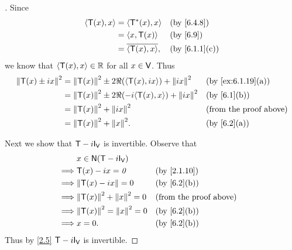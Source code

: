\begin{proof}[]
	Since
	\begin{align*}
		\inn{\T(x), x} & = \inn{\T^*(x), x}       &  & \by{6.4.8}    \\
		               & = \inn{x, \T(x)}         &  & \by{6.9}      \\
		               & = \conj{\inn{\T(x), x}}, &  & \by{6.1.1}[c]
	\end{align*}
	we know that \(\left\langle\mathsf{T}(x), x\right\rangle \in \mathbb{R}\) for all \(x \in \mathsf{V}\).
	Thus
	\begin{align*}
		\norm{\T(x) \pm ix}^2 & = \norm{\T(x)}^2 \pm 2 \Re(\inn{\T(x), ix}) + \norm{ix}^2   &  & \by{ex:6.1.19}[a]             \\
		                      & = \norm{\T(x)}^2 \pm 2 \Re(-i \inn{\T(x), x}) + \norm{ix}^2 &  & \by{6.1}[b]                   \\
		                      & = \norm{\T(x)}^2 + \norm{ix}^2                              &  & \text{(from the proof above)} \\
		                      & = \norm{\T(x)}^2 + \norm{x}^2.                              &  & \by{6.2}[a]
	\end{align*}

	Next we show that \(\T - i \IT[\V]\) is invertible.
	Observe that
	\begin{align*}
		         & x \in \ns{\T - i \IT[\V]}                                          \\
		\implies & \T(x) - ix = \zv                &  & \by{2.1.10}                   \\
		\implies & \norm{\T(x) - ix} = 0           &  & \by{6.2}[b]                   \\
		\implies & \norm{\T(x)}^2 + \norm{x}^2 = 0 &  & \text{(from the proof above)} \\
		\implies & \norm{\T(x)}^2 = \norm{x}^2 = 0 &  & \by{6.2}[b]                   \\
		\implies & x = 0.                          &  & \by{6.2}[b]
	\end{align*}
	Thus by \cref{2.5} \(\T - i \IT[\V]\) is invertible.


\end{proof}
